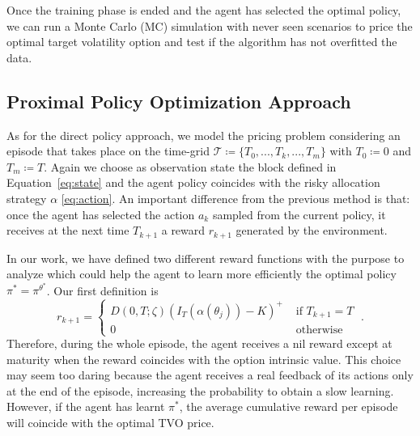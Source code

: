 \documentclass[11pt]{article}
\begin{document}
Once the training phase is ended and the agent has selected the optimal policy, we can run a Monte Carlo (MC) simulation with never seen scenarios to price the optimal target volatility option and test if the algorithm has not overfitted the data.
 
\subsection{Proximal Policy Optimization Approach}
As for the direct policy approach, we model the pricing problem considering an episode that takes place on the time-grid $\mathcal{T}\coloneqq \{T_0,...,T_k,...,T_m\}$ with $T_0\coloneqq 0$ and $T_m \coloneqq T$. Again we choose as observation state the block defined in Equation~\eqref{eq:state} and the agent policy coincides with the risky allocation strategy $\alpha$ \eqref{eq:action}. An important difference from the previous method is that: once the agent has selected the action $a_k$ sampled from the current policy, it receives at the next time $T_{k+1}$ a reward $r_{k+1}$ generated by the environment. 

In our work, we have defined two different reward functions with the purpose to analyze which could help the agent to learn more efficiently the optimal policy $\pi^* = \pi^{\theta^*}$. 
Our first definition is
 \begin{equation}
 	r_{k+1}=\left\{\begin{array}{ll}
 		 D(0,T;\zeta)(I_T(\alpha(\theta_j)) - K)^+ & \text { if } T_{k+1} = T \\
 		0 & \text { otherwise }
 	\end{array}\right.
 \label{eq:reward1} \; . \end{equation}
Therefore, during the whole episode, the agent receives a nil reward except at maturity when the reward coincides with the option intrinsic value. This choice may seem too daring because the agent receives a real feedback of its actions only at the end of the episode, increasing the probability to obtain a slow learning. However, if the agent has learnt $\pi^*$, the average cumulative reward per episode will coincide with the optimal TVO price. 
\end{document}
